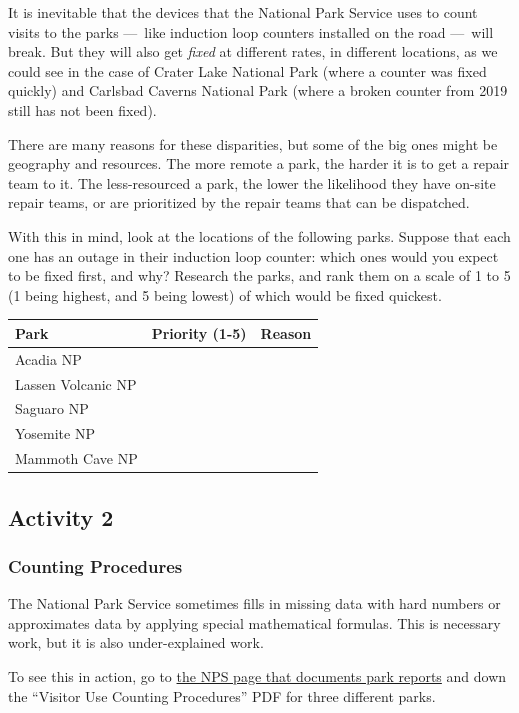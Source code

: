 \documentclass[
  letterpaper,
  DIV=11,
  numbers=noendperiod]{scrartcl}
\begin{document}
It is inevitable that the devices that the National Park Service uses to
count visits to the parks ---~like induction loop counters installed on
the road ---~will break. But they will also get \emph{fixed} at
different rates, in different locations, as we could see in the case of
Crater Lake National Park (where a counter was fixed quickly) and
Carlsbad Caverns National Park (where a broken counter from 2019 still
has not been fixed).

There are many reasons for these disparities, but some of the big ones
might be geography and resources. The more remote a park, the harder it
is to get a repair team to it. The less-resourced a park, the lower the
likelihood they have on-site repair teams, or are prioritized by the
repair teams that can be dispatched.

With this in mind, look at the locations of the following parks. Suppose
that each one has an outage in their induction loop counter: which ones
would you expect to be fixed first, and why? Research the parks, and
rank them on a scale of 1 to 5 (1 being highest, and 5 being lowest) of
which would be fixed quickest.

\begin{longtable}[]{@{}lll@{}}
\toprule\noalign{}
Park & Priority (1-5) & Reason \\
\midrule\noalign{}
\endhead
\bottomrule\noalign{}
\endlastfoot
Acadia NP & & \\
Lassen Volcanic NP & & \\
Saguaro NP & & \\
Yosemite NP & & \\
Mammoth Cave NP & & \\
\end{longtable}

\subsection{Activity 2}\label{activity-2-1}

\subsubsection{Counting Procedures}\label{counting-procedures}

The National Park Service sometimes fills in missing data with hard
numbers or approximates data by applying special mathematical formulas.
This is necessary work, but it is also under-explained work.

To see this in action, go to
\href{https://irma.nps.gov/Stats/Reports/Park}{the NPS page that
documents park reports} and down the ``Visitor Use Counting Procedures''
PDF for three different parks.
\end{document}
